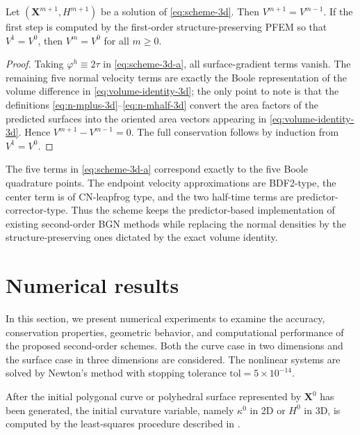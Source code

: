 \documentclass[smallextended]{svjour3}
\numberwithin{equation}{section}
\begin{document}
	\begin{theorem}
		\label{thm:volume-conservation-3d}
		Let $(\mathbf{X}^{m+1},H^{m+1})$ be a solution of \eqref{eq:scheme-3d}. Then $V^{m+1}=V^{m-1}$. If the first step is computed by the first-order structure-preserving PFEM so that $V^1=V^0$, then $V^m=V^0$ for all $m\ge0$.
	\end{theorem}
	
	\begin{proof}
		Taking $\varphi^h\equiv2\tau$ in \eqref{eq:scheme-3d-a}, all surface-gradient terms vanish. The remaining five normal velocity terms are exactly the Boole representation of the volume difference in \eqref{eq:volume-identity-3d}; the only point to note is that the definitions \eqref{eq:n-mplus-3d}--\eqref{eq:n-mhalf-3d} convert the area factors of the predicted surfaces into the oriented area vectors appearing in \eqref{eq:volume-identity-3d}. Hence $V^{m+1}-V^{m-1}=0$. The full conservation follows by induction from $V^1=V^0$.
	\end{proof}
	
	\begin{remark}
		The five terms in \eqref{eq:scheme-3d-a} correspond exactly to the five Boole quadrature points. The endpoint velocity approximations are BDF2-type, the center term is of CN-leapfrog type, and the two half-time terms are predictor-corrector-type. Thus the scheme keeps the predictor-based implementation of existing second-order BGN methods while replacing the normal densities by the structure-preserving ones dictated by the exact volume identity.
	\end{remark}
	
	\section{Numerical results}
	\label{sec:numerics}
	
	In this section, we present numerical experiments to examine the accuracy, conservation properties, geometric behavior, and computational performance of the proposed second-order schemes. Both the curve case in two dimensions and the surface case in three dimensions are considered. The nonlinear systems are solved by Newton's method with stopping tolerance $\mathrm{tol}=5\times10^{-14}$.
	
	After the initial polygonal curve or polyhedral surface represented by $\mathbf{X}^0$ has been generated, the initial curvature variable, namely $\kappa^0$ in 2D or $H^0$ in 3D, is computed by the least-squares procedure described in \cite{jiang2024second}.
	
\end{document}
